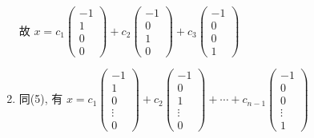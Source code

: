 \begin{enumerate}
                   故 \( x = c_{1}\begin{pmatrix}
                       -1 \\
                       1  \\
                       0  \\
                       0
                   \end{pmatrix} + c_{2}\begin{pmatrix}
                       -1 \\
                       0  \\
                       1  \\
                       0
                   \end{pmatrix} + c_{3}\begin{pmatrix}
                       -1 \\
                       0  \\
                       0  \\
                       1
                   \end{pmatrix} \)
             \item %
                   同(5), 有 \( x = c_{1}\begin{pmatrix}
                       -1     \\
                       1      \\
                       0      \\
                       \vdots \\
                       0
                   \end{pmatrix} + c_{2}\begin{pmatrix}
                       -1     \\
                       0      \\
                       1      \\
                       \vdots \\
                       0
                   \end{pmatrix} + \cdots + c_{n-1}\begin{pmatrix}
                       -1     \\
                       0      \\
                       0      \\
                       \vdots \\
                       1
                   \end{pmatrix} \)
         \end{enumerate}


